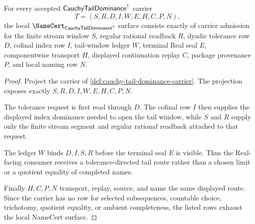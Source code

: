 \begin{theorem}
\label{thm:cauchy-tail-dominance-namecert-obligations}
For every accepted $\mathsf{CauchyTailDominance}^{\uparrow}$ carrier
$$
T=(S,R,D,I,W,E,H,C,P,N),
$$
the local $\NameCert_{\CauchyTailDominanceUp}$ surface consists exactly of carrier admission for the finite stream window $S$, regular rational readback $R$, dyadic tolerance row $D$, cofinal index row $I$, tail-window ledger $W$, terminal Real seal $E$, componentwise transport $H$, displayed continuation replay $C$, package provenance $P$, and local naming row $N$.
\end{theorem}
\begin{proof}
Project the carrier of \autoref{def:cauchy-tail-dominance-carrier}. The projection exposes exactly $S,R,D,I,W,E,H,C,P,N$.

The tolerance request is first read through $D$. The cofinal row $I$ then supplies the displayed index dominance needed to open the tail window, while $S$ and $R$ supply only the finite stream segment and regular rational readback attached to that request.

The ledger $W$ binds $D,I,S,R$ before the terminal seal $E$ is visible. Thus the Real-facing consumer receives a tolerance-directed tail route rather than a chosen limit or a quotient equality of completed names.

Finally $H,C,P,N$ transport, replay, source, and name the same displayed route. Since the carrier has no row for selected subsequences, countable choice, trichotomy, quotient equality, or ambient completeness, the listed rows exhaust the local NameCert surface.
\end{proof}

